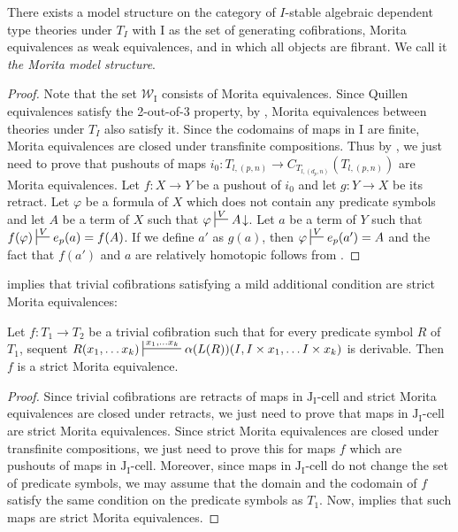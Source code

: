 \documentclass[reqno]{amsart}
\theoremstyle{definition}
\theoremstyle{remark}
\newcommand{\we}{\mathcal{W}}
\newcommand{\I}{\mathrm{I}}
\newcommand{\J}{\mathrm{J}}
\newcommand{\class}[2]{#1\text{-}\mathrm{#2}}
\newcommand{\Icell}[1][\I]{\class{#1}{cell}}
\newcommand{\Jcell}[1][]{\Icell[\J#1]}
\newcommand{\cyli}{i}
\numberwithin{figure}{section}
\begin{document}
\begin{thm}
There exists a model structure on the category of $I$-stable algebraic dependent type theories under $T_I$
with $\I$ as the set of generating cofibrations, Morita equivalences as weak equivalences, and in which all objects are fibrant.
We call it \emph{the Morita model structure}.
\end{thm}
\begin{proof}
Note that the set $\we_\I$ consists of Morita equivalences.
Since Quillen equivalences satisfy the 2-out-of-3 property, by , Morita equivalences between theories under $T_I$ also satisfy it.
Since the codomains of maps in $\I$ are finite, Morita equivalences are closed under transfinite compositions.
Thus by , we just need to prove that pushouts of maps $\cyli_0 : T_{l,(p,n)} \to C_{T_{l,(d_p,n)}}(T_{l,(p,n)})$ are Morita equivalences.
Let $f : X \to Y$ be a pushout of $\cyli_0$ and let $g : Y \to X$ be its retract.
Let $\varphi$ be a formula of $X$ which does not contain any predicate symbols and let $A$ be a term of $X$ such that $\varphi \sststile{}{V} A\!\downarrow$.
Let $a$ be a term of $Y$ such that $f(\varphi) \sststile{}{V} e_p(a) = f(A)$.
If we define $a'$ as $g(a)$, then $\varphi \sststile{}{V} e_p(a') = A$ and the fact that $f(a')$ and $a$ are relatively homotopic follows from .
\end{proof}

 implies that trivial cofibrations satisfying a mild additional condition are strict Morita equivalences:

\begin{prop}
Let $f : T_1 \to T_2$ be a trivial cofibration such that for every predicate symbol $R$ of $T_1$,
sequent $R(x_1, \ldots x_k) \sststile{}{x_1, \ldots x_k} \alpha(L(R))(I, I \times x_1, \ldots I \times x_k)$ is derivable.
Then $f$ is a strict Morita equivalence.
\end{prop}
\begin{proof}
Since trivial cofibrations are retracts of maps in $\Jcell[_\I]$ and strict Morita equivalences are closed under retracts,
we just need to prove that maps in $\Jcell[_\I]$ are strict Morita equivalences.
Since strict Morita equivalences are closed under transfinite compositions, we just need to prove this for maps $f$ which are pushouts of maps in $\Jcell[_\I]$.
Moreover, since maps in $\Jcell[_\I]$ do not change the set of predicate symbols,
we may assume that the domain and the codomain of $f$ satisfy the same condition on the predicate symbols as $T_1$.
Now,  implies that such maps are strict Morita equivalences.
\end{proof}
\end{document}
